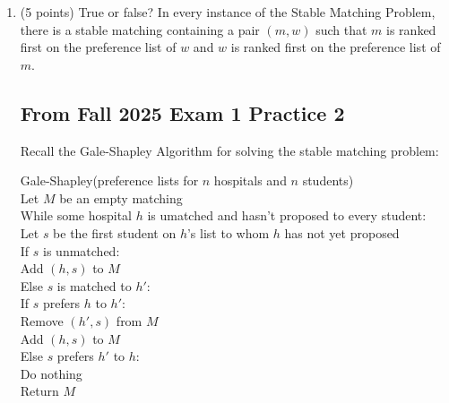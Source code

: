 \documentclass[11pt]{article}
\begin{document}
\begin{enumerate}
\begin{center}
\begin{tabular}{ c c c }
    $m_1$: $w_3$, $w_1$, $w_2$, $w_4$ &  $w_1$: $m_4$, $m_3$, $m_2$, $m_1$\\
    $m_2$: $w_4$, $w_1$, $w_2$, $w_3$ &  $w_2$: $m_4$, $m_3$, $m_2$, $m_1$\\
    $m_3$: $w_2$, $w_1$, $w_3$, $w_4$ &  $w_3$: $m_1$, $m_2$, $m_4$, $m_3$\\ 
    $m_4$: $w_3$, $w_2$, $w_1$, $w_4$ &  $w_4$: $m_1$, $m_3$, $m_4$, $m_2$
\end{tabular}
\end{center}

 What is the outcome of the Gale-Shapley algorithm on this input? Assume that men propose to women.
\vspace{1in}

\item (5 points) True or false? In every instance of the
 Stable Matching Problem, there is a stable matching containing a pair $(m,w)$
 such that $m$ is ranked first on the preference list of $w$ and $w$ is ranked
 first on the preference list of $m$.


\newpage

\subsection*{From Fall 2025 Exam 1 Practice 2}
Recall the Gale-Shapley Algorithm for solving the stable matching problem:

    \begin{algo}
    Gale-Shapley(preference lists for $n$ hospitals and $n$ students)\+\\
    Let $M$ be an empty matching\\
    While some hospital $h$ is umatched and hasn't proposed to every student:\+ \\
        Let $s$ be the first student on $h$'s list to whom $h$ has not yet proposed\\
        If $s$ is unmatched:\+\\
            Add $(h,s)$ to $M$\-\\
        Else $s$ is matched to $h'$:\+\\
            If $s$ prefers $h$ to $h'$:\+\\
                Remove $(h',s)$ from $M$\\
                Add $(h,s)$ to $M$\-\\
            Else $s$ prefers $h'$ to $h$:\+\\
                Do nothing\-\-\-\\
    Return $M$\\
    \end{algo}




\end{enumerate}
\end{document}
